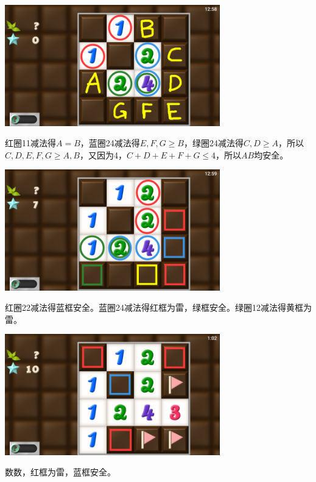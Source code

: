 \subsection{} %
\begin{center}
    \includegraphics[width=0.7\textwidth]{puzzle/139-1.png}
\end{center}
红圈11减法得$A=B$，蓝圈24减法得$E,F,G\ge B$，绿圈24减法得$C,D\ge A$，所以$C,D,E,F,G\ge A,B$，又因为4，$C+D+E+F+G\le 4$，所以$AB$均安全。
\begin{center}
    \includegraphics[width=0.7\textwidth]{puzzle/139-2.png}
\end{center}
红圈22减法得蓝框安全。蓝圈24减法得红框为雷，绿框安全。绿圈12减法得黄框为雷。
\begin{center}
    \includegraphics[width=0.7\textwidth]{puzzle/139-3.png}
\end{center}
数数，红框为雷，蓝框安全。